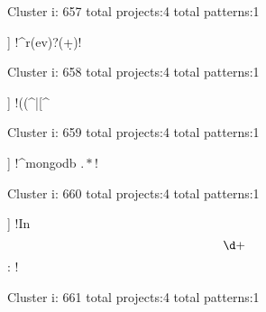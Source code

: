 Cluster i: 657
total projects:4
total patterns:1
\begin{multicols}{1}
\begin{description}[noitemsep,topsep=0pt]
\item [[4] ] \cverb!^r(ev)?\s*(\d+)!
\end{description}
\end{multicols}







Cluster i: 658
total projects:4
total patterns:1
\begin{multicols}{1}
\begin{description}[noitemsep,topsep=0pt]
\item [[4] ] \cverb!((^|[^%
\end{description}
\end{multicols}







Cluster i: 659
total projects:4
total patterns:1
\begin{multicols}{1}
\begin{description}[noitemsep,topsep=0pt]
\item [[4] ] \cverb!^mongodb \(.*\)!
\end{description}
\end{multicols}







Cluster i: 660
total projects:4
total patterns:1
\begin{multicols}{1}
\begin{description}[noitemsep,topsep=0pt]
\item [[4] ] \cverb!In\ \[\d+\]: !
\end{description}
\end{multicols}







Cluster i: 661
total projects:4
total patterns:1
\begin{multicols}{1}
\end{multicols}







